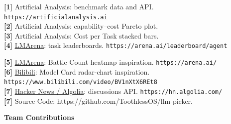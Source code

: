 \documentclass[
  17pt,
  a1paper,
  portrait
]{tikzposter}
\newcommand{\posterblock}[2]{%
  \block[titleleft,roundedcorners=16]
  {\color{MyOrange}#1}
  {\raggedright #2}
}
\begin{document}

\posterblock{References}{
  \begin{minipage}[t]{0.65\linewidth}
    \begin{minipage}[t]{0.47\linewidth}
      \fontsize{13}{15}\selectfont

      \textcolor{MyOrange}{\textbf{[1]}}
      Artificial Analysis: benchmark data and API.
      \href{https://artificialanalysis.ai/}
      {\texttt{https://artificialanalysis.ai}}\\[0.25em]

      \textcolor{MyOrange}{\textbf{[2]}}
      Artificial Analysis: capability--cost Pareto plot.\\[0.25em]

      \textcolor{MyOrange}{\textbf{[3]}}
      Artificial Analysis: Cost per Task stacked bars.\\[0.25em]

      \textcolor{MyOrange}{\textbf{[4]}}
      \href{https://arena.ai/leaderboard/agent}
      {LMArena}: task leaderboards.
      {\texttt{https://arena.ai/leaderboard/agent}}
    \end{minipage}
    \hfill
    \begin{minipage}[t]{0.47\linewidth}
      \fontsize{13}{15}\selectfont

      \textcolor{MyOrange}{\textbf{[5]}}
      \href{https://arena.ai/}
      {LMArena}: Battle Count heatmap inspiration.
      {\texttt{https://arena.ai/}}\\[0.25em]

      \textcolor{MyOrange}{\textbf{[6]}}
      \href{https://www.bilibili.com/video/BV1nXtX6REt8}
      {Bilibili}: Model Card radar-chart inspiration.
      \texttt{https://www.bilibili.com/video/BV1nXtX6REt8}\\[0.25em]

      \textcolor{MyOrange}{\textbf{[7]}}
      \href{https://hn.algolia.com/}
      {Hacker News / Algolia}: discussions API.
      \texttt{https://hn.algolia.com/}\\[0.25em]

      \textcolor{MyOrange}{\textbf{[7]}}
      {Source Code}: https://github.com/ToothlessOS/llm-picker.

      
    \end{minipage}
  \end{minipage}
  \hfill
  \begin{minipage}[t]{0.32\linewidth}
    \noindent
    \begin{minipage}[t]{0.75\linewidth}
      {\color{MyOrange}\bfseries\fontsize{16}{19}\selectfont
        Team Contributions}
    \end{minipage}
    \hfill
    \begin{minipage}[t]{0.20\linewidth}
      \centering
      \href{https://github.com/ToothlessOS/llm-picker}{%
        {\fontsize{32}{35}\selectfont
          \color{MyBrown}\faGithub}}
    \end{minipage}
    \par\vspace{0.12em}


\end{minipage}}
\end{document}
